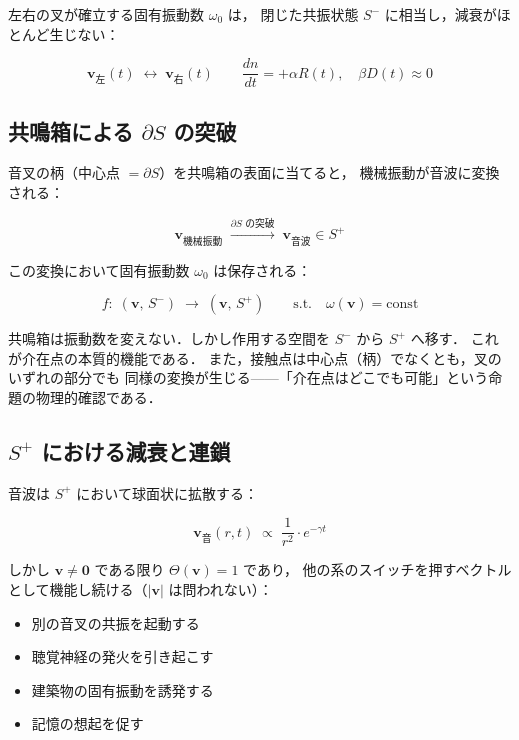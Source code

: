 \documentclass[12pt, a4paper]{article}
\theoremstyle{definition}
\newcommand{\vzero}{\mathbf{0}}
\newcommand{\Switch}{\Theta}
\begin{document}
左右の叉が確立する固有振動数 $\omega_0$ は，
閉じた共振状態 $S^-$ に相当し，減衰がほとんど生じない：

\begin{equation}
  \mathbf{v}_{\text{左}}(t) \;\longleftrightarrow\; \mathbf{v}_{\text{右}}(t)
  \qquad
  \frac{dn}{dt} = +\alpha R(t), \quad \beta D(t) \approx 0
\end{equation}

\subsection{共鳴箱による $\partial S$ の突破}

音叉の柄（中心点 $= \partial S$）を共鳴箱の表面に当てると，
機械振動が音波に変換される：

\begin{equation}
  \mathbf{v}_{\text{機械振動}}
  \;\xrightarrow{\partial S \text{ の突破}}\;
  \mathbf{v}_{\text{音波}} \in S^+
\end{equation}

この変換において固有振動数 $\omega_0$ は保存される：

\begin{equation}
  f:\; (\mathbf{v},\, S^-) \;\to\; (\mathbf{v},\, S^+)
  \qquad \text{s.t.}\quad \omega(\mathbf{v}) = \mathrm{const}
  \label{eq:boundary_transform}
\end{equation}

共鳴箱は振動数を変えない．しかし作用する空間を $S^-$ から $S^+$ へ移す．
これが介在点の本質的機能である．
また，接触点は中心点（柄）でなくとも，叉のいずれの部分でも
同様の変換が生じる——「介在点はどこでも可能」という命題の物理的確認である．

\subsection{$S^+$ における減衰と連鎖}

音波は $S^+$ において球面状に拡散する：

\begin{equation}
  \mathbf{v}_{\text{音}}(r, t) \;\propto\; \frac{1}{r^2} \cdot e^{-\gamma t}
\end{equation}

しかし $\mathbf{v} \neq \vzero$ である限り $\Switch(\mathbf{v}) = 1$ であり，
他の系のスイッチを押すベクトルとして機能し続ける（$|\mathbf{v}|$ は問われない）：

\begin{itemize}
  \item 別の音叉の共振を起動する
  \item 聴覚神経の発火を引き起こす
  \item 建築物の固有振動を誘発する
  \item 記憶の想起を促す
\end{itemize}
\end{document}
